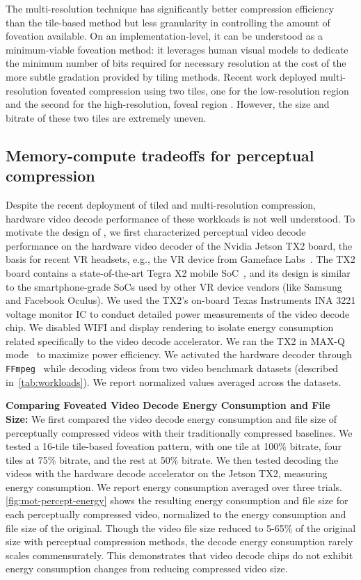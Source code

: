 The multi-resolution technique has significantly better compression efficiency than the tile-based method but less granularity in controlling the amount of foveation available.
On an implementation-level, it can be understood as a minimum-viable foveation method: it leverages human visual models to dedicate the minimum number of bits required for necessary resolution at the cost of the more subtle gradation provided by tiling methods.
Recent work deployed multi-resolution foveated compression using two tiles, one for the low-resolution region and the second for the high-resolution, foveal region \cite{google-foveation}.
However, the size and bitrate of these two tiles are extremely uneven.



\subsection{Memory-compute tradeoffs for perceptual compression}
Despite the recent deployment of tiled and multi-resolution compression, hardware video decode performance of these workloads is not well understood.
To motivate the design of \nameArch, we first characterized perceptual video decode performance on the hardware video decoder of the Nvidia Jetson TX2 board, the basis for recent VR headsets, e.g., the VR device from Gameface Labs~\cite{gameface}.
The TX2 board contains a state-of-the-art Tegra X2 mobile SoC~\cite{nvidia-jetson-tx2}, and its design is similar to the smartphone-grade SoCs used by other VR device vendors (like Samsung and Facebook Oculus).
We used the TX2's on-board Texas Instruments INA 3221 voltage monitor IC to conduct detailed power measurements of the video decode chip.
We disabled WIFI and display rendering to isolate energy consumption related specifically to the video decode accelerator.
We ran the TX2 in MAX-Q mode~\cite{nvidia-jetson-reference} to maximize power efficiency.
We activated the hardware decoder through \texttt{FFmpeg}~\cite{ffmpeg} while decoding videos from two video benchmark datasets (described in~\ref{tab:workloads}). We report normalized values averaged across the datasets.

\motivationComputeMemEnergyTime

\textbf{Comparing Foveated Video Decode Energy Consumption and File Size:} We first compared the video decode energy consumption and file size of perceptually compressed videos with their traditionally compressed baselines.
We tested a 16-tile tile-based foveation pattern, with one tile at 100\% bitrate, four tiles at 75\% bitrate, and the rest at 50\% bitrate.
We then tested decoding the videos with the hardware decode accelerator on the Jetson TX2, measuring energy consumption.
We report energy consumption averaged over three trials.
\ref{fig:mot-percept-energy} shows the resulting energy consumption and file size for each perceptually compressed video, normalized to the energy consumption and file size of the original.
Though the video file size reduced to 5-65\% of the original size with perceptual compression methods, the decode energy consumption rarely scales commensurately.
This demonstrates that video decode chips do not exhibit energy consumption changes from reducing compressed video size.

